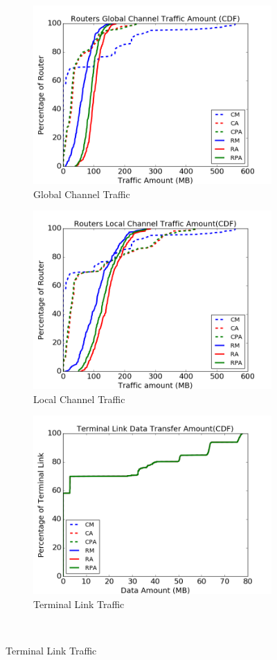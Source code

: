 \documentclass[conference,compsoc]{IEEEtran}
\begin{document}
\begin{figure}[t]
    \centering
    \begin{subfigure}[t]{0.32\textwidth}
        \centering
        \includegraphics[height=1.8 in]{syn-wkld/gc-traffic}
        \caption{Global Channel Traffic}
        \label{fig:synwkld-global-channel-traffic}
    \end{subfigure}\hfill
    \hspace{1em}%
    \begin{subfigure}[t]{0.32\textwidth}
        \centering
        \includegraphics[height=1.8 in]{syn-wkld/lc-traffic}
        \caption{Local Channel Traffic}
        \label{fig:synwkld-local-channel-traffic}
    \end{subfigure}\hfill
    \hspace{1em}%
    \begin{subfigure}[t]{0.32\textwidth}
        \centering
        \includegraphics[height=1.8 in]{syn-wkld/tl-traffic}
        \caption{Terminal Link Traffic}
        \label{fig:synwkld-terminal-link-traffic}
    \end{subfigure}\\


\end{figure}
\end{document}
